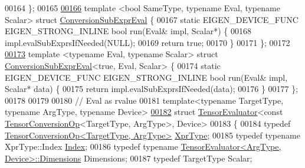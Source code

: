\begin{DoxyCode}
00164 \};
00165 
\hyperlink{struct_eigen_1_1_conversion_sub_expr_eval}{00166} \textcolor{keyword}{template} <\textcolor{keywordtype}{bool} SameType, \textcolor{keyword}{typename} Eval, \textcolor{keyword}{typename} Scalar> \textcolor{keyword}{struct }
      \hyperlink{struct_eigen_1_1_conversion_sub_expr_eval}{ConversionSubExprEval} \{
00167   \textcolor{keyword}{static} EIGEN\_DEVICE\_FUNC EIGEN\_STRONG\_INLINE \textcolor{keywordtype}{bool} run(Eval& impl, Scalar*) \{
00168     impl.evalSubExprsIfNeeded(NULL);
00169     \textcolor{keywordflow}{return} \textcolor{keyword}{true};
00170   \}
00171 \};
00172 
\hyperlink{struct_eigen_1_1_conversion_sub_expr_eval_3_01true_00_01_eval_00_01_scalar_01_4}{00173} \textcolor{keyword}{template} <\textcolor{keyword}{typename} Eval, \textcolor{keyword}{typename} Scalar> \textcolor{keyword}{struct }\hyperlink{struct_eigen_1_1_conversion_sub_expr_eval}{ConversionSubExprEval}<true, Eval, 
      Scalar> \{
00174   \textcolor{keyword}{static} EIGEN\_DEVICE\_FUNC EIGEN\_STRONG\_INLINE \textcolor{keywordtype}{bool} run(Eval& impl, Scalar* data) \{
00175     \textcolor{keywordflow}{return} impl.evalSubExprsIfNeeded(data);
00176   \}
00177 \};
00178 
00179 
00180 \textcolor{comment}{// Eval as rvalue}
00181 \textcolor{keyword}{template}<\textcolor{keyword}{typename} TargetType, \textcolor{keyword}{typename} ArgType, \textcolor{keyword}{typename} Device>
\hyperlink{struct_eigen_1_1_tensor_evaluator_3_01const_01_tensor_conversion_op_3_01_target_type_00_01_arg_type_01_4_00_01_device_01_4}{00182} \textcolor{keyword}{struct }\hyperlink{struct_eigen_1_1_tensor_evaluator}{TensorEvaluator}<const \hyperlink{class_eigen_1_1_tensor_conversion_op}{TensorConversionOp}<TargetType, ArgType>, 
      Device>
00183 \{
00184   \textcolor{keyword}{typedef} \hyperlink{class_eigen_1_1_tensor_conversion_op}{TensorConversionOp<TargetType, ArgType>} 
      \hyperlink{class_eigen_1_1_tensor_conversion_op}{XprType};
00185   \textcolor{keyword}{typedef} \textcolor{keyword}{typename} XprType::Index \hyperlink{namespace_eigen_a62e77e0933482dafde8fe197d9a2cfde}{Index};
00186   \textcolor{keyword}{typedef} \textcolor{keyword}{typename} \hyperlink{struct_eigen_1_1_tensor_evaluator}{TensorEvaluator<ArgType, Device>::Dimensions}
       Dimensions;
00187   \textcolor{keyword}{typedef} TargetType Scalar;

\end{DoxyCode}
